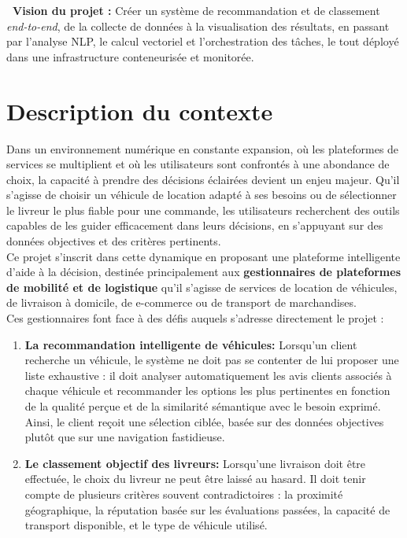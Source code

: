 \documentclass[11pt,a4paper]{report}
\newcommand{\concept}[1]{\textcolor{arasPrimary}{\textbf{#1}}}
\begin{document}
\begin{processbox}
    \textbf{\textcolor{arasPrimary}{\faLightbulb\ Vision du projet :}} Créer un système de recommandation et de classement \textit{end-to-end}, de la collecte de données à la visualisation des résultats, en passant par l'analyse NLP, le calcul vectoriel et l'orchestration des tâches, le tout déployé dans une infrastructure conteneurisée et monitorée.
\end{processbox}

\section{Description du contexte}

Dans un environnement numérique en constante expansion, où les plateformes de services se multiplient et où les utilisateurs sont confrontés à une abondance de choix, la capacité à prendre des décisions éclairées devient un enjeu majeur. Qu'il s'agisse de choisir un véhicule de location adapté à ses besoins ou de sélectionner le livreur le plus fiable pour une commande, les utilisateurs recherchent des outils capables de les guider efficacement dans leurs décisions, en s'appuyant sur des données objectives et des critères pertinents.\\

Ce projet s'inscrit dans cette dynamique en proposant une plateforme intelligente d'aide à la décision, destinée principalement aux \concept{gestionnaires de plateformes de mobilité et de logistique} qu'il s'agisse de services de location de véhicules, de livraison à domicile, de e-commerce ou de transport de marchandises.\\

Ces gestionnaires font face à des défis auquels s'adresse directement le projet :\\

\begin{enumerate}
    \item \textbf{La recommandation intelligente de véhicules:} Lorsqu'un client recherche un véhicule, le système ne doit pas se contenter de lui proposer une liste exhaustive : il doit analyser automatiquement les avis clients associés à chaque véhicule et recommander les options les plus pertinentes en fonction de la qualité perçue et de la similarité sémantique avec le besoin exprimé. Ainsi, le client reçoit une sélection ciblée, basée sur des données objectives plutôt que sur une navigation fastidieuse.

\item \textbf{Le classement objectif des livreurs: } Lorsqu'une livraison doit être effectuée, le choix du livreur ne peut être laissé au hasard. Il doit tenir compte de plusieurs critères souvent contradictoires : la proximité géographique, la réputation basée sur les évaluations passées, la capacité de transport disponible, et le type de véhicule utilisé.\\
\end{enumerate}
\end{document}
